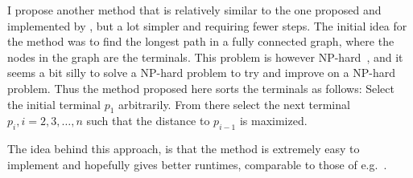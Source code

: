 I propose another method that is relatively similar to the one proposed and
implemented by \textcite{fonseca2014}, but a lot simpler and requiring fewer
steps. The initial idea for the method was to find the longest path in a fully
connected graph, where the nodes in the graph are the terminals. This problem is
however NP-hard~\cite{longestpathproblem}, and it seems a bit silly to solve a
NP-hard problem to try and improve on a NP-hard problem. Thus the method
proposed here sorts the terminals as follows: Select the initial terminal $p_1$
arbitrarily. From there select the next terminal $p_i, i = 2, 3, \ldots, n$ such
that the distance to $p_{i-1}$ is maximized.

The idea behind this approach, is that the method is extremely easy to implement
and hopefully gives better runtimes, comparable to those of e.g.\
\textcite{fonseca2014}.

